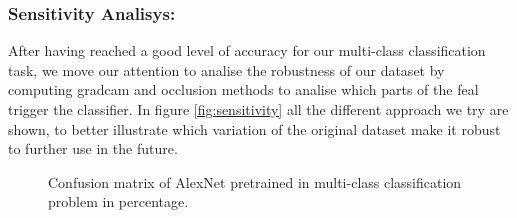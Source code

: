 \subsubsection{Sensitivity Analisys:}
After having reached a good level of accuracy for our multi-class classification task, we move our attention to analise the robustness of our dataset by computing gradcam and occlusion methods to analise which parts of the feal trigger the classifier. In figure \ref{fig:sensitivity} all the different approach we try are shown, to better illustrate which variation of the original dataset make it robust to further use in the future.
\begin{figure}[t]
	\begin{center}
	\end{center}
	\caption{Confusion matrix of AlexNet pretrained in multi-class classification problem in percentage. }
	\label{fig:sensitivity}
	\label{fig:long}
	\label{fig:onecol}
\end{figure}
